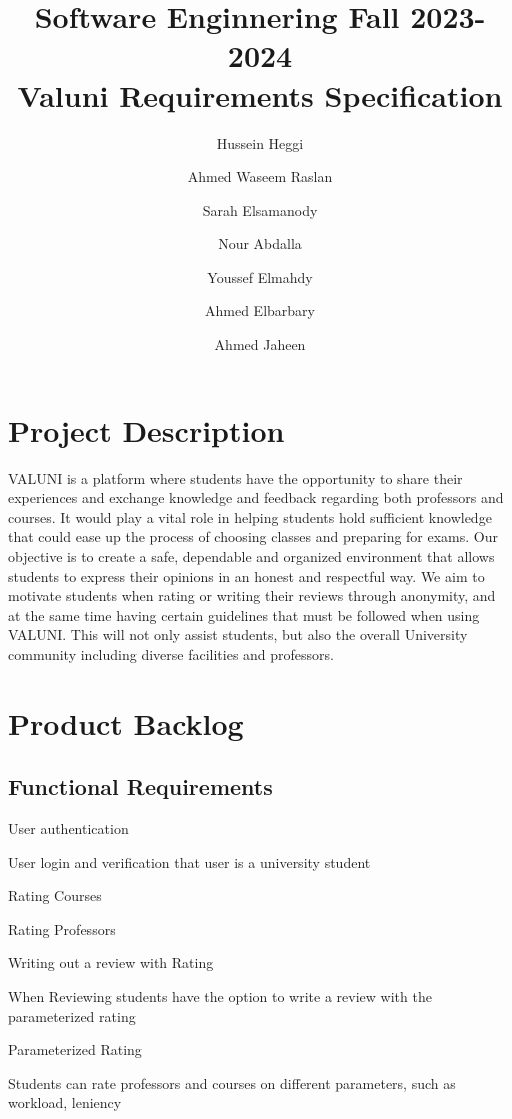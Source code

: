 \documentclass{article}
\title{Software Enginnering Fall 2023-2024 \\ Valuni Requirements Specification}
\author{  
Hussein Heggi 	\and
Ahmed Waseem Raslan 	\and
Sarah Elsamanody 	\and
Nour Abdalla 	\and
Youssef Elmahdy	\and
Ahmed Elbarbary	\and 
Ahmed Jaheen}
\begin{document}
\maketitle 

\break

\section*{Project Description}
VALUNI is a platform where students have the opportunity to share their experiences and exchange knowledge and feedback regarding both professors and courses.  It would play a vital role in helping students hold sufficient knowledge that could ease up the process of choosing classes and preparing for exams. Our objective is to create a safe, dependable and organized environment that allows students to express their opinions in an honest and respectful way. We aim to motivate students when rating or writing their reviews through anonymity, and at the same time having certain guidelines that must be followed when using VALUNI. This will not only assist students, but also the overall University community including diverse facilities and professors. 

\section{Product Backlog}

\subsection{Functional Requirements}

	\quad User authentication 
	\vspace{-0.2cm}

	\qquad \scriptsize User login and verification that user is a university student \normalsize

	\quad Rating Courses

	\quad Rating Professors

	\quad Writing out a review with Rating
	\vspace{-0.2cm}

	\qquad \scriptsize When Reviewing students have the option to write a review with the parameterized rating \normalsize

	\quad Parameterized Rating
	\vspace{-0.2cm}

	\qquad \scriptsize Students can rate professors and courses on different parameters, such as workload, leniency \normalsize
\end{document}
